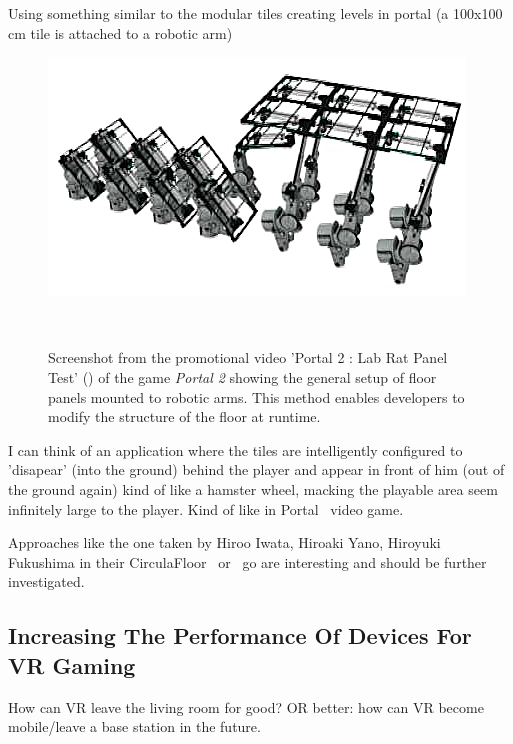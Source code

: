 Using something similar to the modular tiles creating levels in portal (a 100x100 cm tile is attached to a robotic arm)

\begin{figure}
	\centering
	\includegraphics[width=0.9\columnwidth]{./figures/portallabrattest}
	\caption[Portal 2 : Lab Rat Panel Test]{Screenshot from the promotional video 'Portal 2 : Lab Rat Panel Test' (\ccbyncsa) of the game \textit{Portal 2 \textregistered\textcopyright} showing the general setup of floor panels mounted to robotic arms. This method enables developers to modify the structure of the floor at runtime.\footnotemark}~\label{fig:portallabrattest}
\end{figure}

I can think of an application where the tiles are intelligently configured to 'disapear' (into the ground) behind the player and appear in front of him (out of the ground again) kind of like a hamster wheel, macking the playable area seem infinitely large to the player. Kind of like in Portal~\cite{game:portal} video game.

Approaches like the one taken by Hiroo Iwata, Hiroaki Yano, Hiroyuki Fukushima in their CirculaFloor~\cite{Iwata:2005:CLI:1078037.1079777} or~\cite{Souman:2010:MVW:1670671.1670675} go are interesting and should be further investigated. 


\subsection{Increasing The Performance Of Devices For VR Gaming}
How can VR leave the living room for good? OR better: how can VR become mobile/leave a base station in the future.


